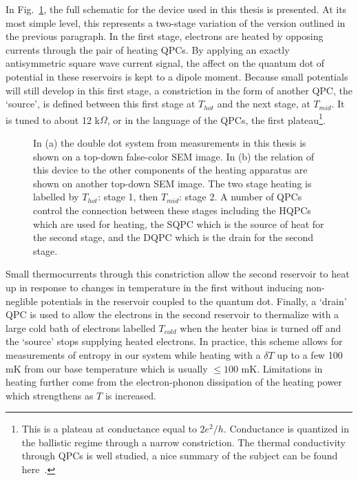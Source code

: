 In Fig.~\ref{fig:fulldevice}, the full schematic for the device used in this thesis is presented. At its most simple level, this represents a two-stage variation of the version outlined in the previous paragraph. In the first stage, electrons are heated by opposing currents through the pair of heating QPCs. By applying an exactly antisymmetric square wave current signal, the affect on the quantum dot of potential in these reservoirs is kept to a dipole moment. Because small potentials will still develop in this first stage, a constriction in the form of another \ac{QPC}, the `source', is defined between this first stage at $T_{hot}$ and the next stage, at $T_{mid}$. It is tuned to about 12 k$\Omega$, or in the language of the \ac{QPC}s, the first plateau\footnote{This is a plateau at conductance equal to $2e^2/h$. Conductance is quantized in the ballistic regime through a narrow constriction. The thermal conductivity through \ac{QPC}s is well studied, a nice summary of the subject can be found here~\cite{van2005quantum}.}.
\begin{figure}[h]
\centering
{}
\caption{In (a) the double dot system from measurements in this thesis is shown on a top-down false-color \ac{SEM} image. In (b) the relation of this device to the other components of the heating apparatus are shown on another top-down \ac{SEM} image. The two stage heating is labelled by $T_{hot}$: stage 1, then $T_{mid}$: stage 2. A number of \ac{QPC}s control the connection between these stages including the HQPCs which are used for heating, the SQPC which is the source of heat for the second stage, and the DQPC which is the drain for the second stage.}
\label{fig:fulldevice}       
\end{figure}
Small thermocurrents through this constriction allow the second reservoir to heat up in response to changes in temperature in the first without inducing non-neglible potentials in the reservoir coupled to the quantum dot. Finally, a `drain' \ac{QPC} is used to allow the electrons in the second reservoir to thermalize with a large cold bath of electrons labelled $T_{cold}$ when the heater bias is turned off and the `source' stops supplying heated electrons. In practice, this scheme allows for measurements of entropy in our system while heating with a $\delta T$ up to a few 100 mK from our base temperature which is usually $\leq 100$ mK. Limitations in heating further come from the electron-phonon dissipation of the heating power which strengthens as $T$ is increased.


